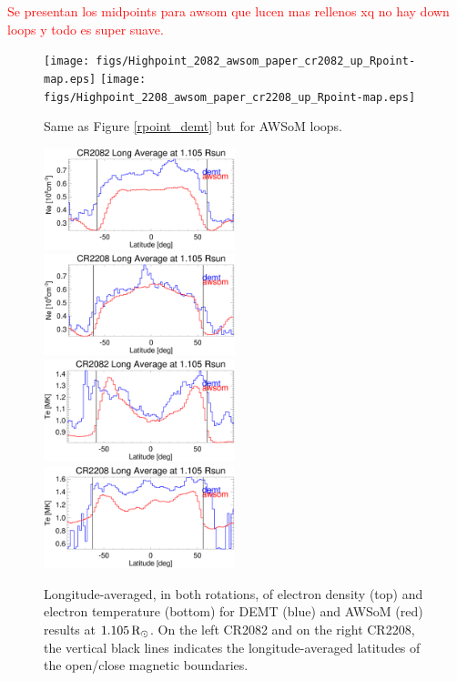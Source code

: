 \documentclass[namedreferences]{solarphysics}
\newcommand{\mrsun}{{\rm R_\odot}}
\begin{document}
\begin{article}
\textcolor{red}{Se presentan los midpoints para awsom que lucen mas rellenos xq no hay down loops y todo es super suave.}

\begin{figure}[h!]
\begin{center}
\texttt{[image: figs/Highpoint\_2082\_awsom\_paper\_cr2082\_up\_Rpoint-map.eps]}
\texttt{[image: figs/Highpoint\_2208\_awsom\_paper\_cr2208\_up\_Rpoint-map.eps]}
\caption{Same as Figure \ref{rpoint_demt} but for AWSoM loops.}
\label{rpoint_awsom}
\end{center}
\end{figure} 

\begin{figure}[h!]
\begin{center}
\includegraphics[width=0.495\textwidth]{figs/Perfil_Ne_demt_awsom_2082_1105.eps}
\includegraphics[width=0.495\textwidth]{figs/Perfil_Ne_demt_awsom_2208_1105.eps}
\includegraphics[width=0.495\textwidth]{figs/Perfil_Te_demt_awsom_2082_1105.eps}
\includegraphics[width=0.495\textwidth]{figs/Perfil_Te_demt_awsom_2208_1105.eps}
\caption{Longitude-averaged, in both rotations, of electron density (top) and electron temperature (bottom) for DEMT (blue) and AWSoM (red) results at $1.105\,\mrsun$. On the left CR2082 and on the right CR2208, the vertical black lines indicates the longitude-averaged latitudes of the open/close magnetic boundaries.}
\label{perf_lon_ne}
\end{center}
\end{figure}




\end{article}
\end{document}
